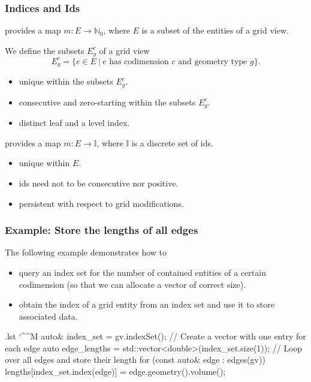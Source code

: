 \documentclass[ignorenonframetext,11pt]{beamer}
\makeatletter
\theoremstyle{definition}
\newenvironment{codeblock}{%
  \begin{tcolorbox}[size=small,oversize,boxrule=0pt,opacityframe=0,colback=blue!30!black!5!white]}{%
  \end{tcolorbox}}
\newenvironment{cppcode}{%
  \begingroup
  \@bsphack
  \immediate\openout\lstvrb@out\jobname.lst
  \let\do\@makeother\dospecials\catcode`\^^M\active
  \def\verbatim@processline{%
    \immediate\write\lstvrb@out{\the\verbatim@line}}%
  \verbatim@start}{%
  \immediate\closeout\lstvrb@out
  \@esphack
  \endgroup
  \begin{codeblock}
    \vspace*{-1ex}
    
    \vspace*{-1ex}
  \end{codeblock}}
\makeatother
\begin{document}
\begin{frame}
  \frametitle{Indices and Ids}

  provides a map $m : E \to \mathbb{N}_0$,
  where $E$ is a subset of the entities of a grid view.

  We define the subsets $E_g^c$ of a grid view
  \[ E_g^c = \{e\in E \ | \ \textrm{$e$ has codimension $c$ and geometry type $g$} \}.\]

  \begin{itemize}
  \item unique within the subsets $E_g^c$.
  \item consecutive and zero-starting within the subsets $E_g^c$.
  \item distinct leaf and a level index.
  \end{itemize}

  \pause
  provides a map $m : E \to \mathbb{I}$, where $\mathbb{I}$ is a discrete
  set of ids.

  \begin{itemize}
  \item unique within $E$.
  \item ids need not to be consecutive nor positive.
  \item persistent with respect to grid modifications.
  \end{itemize}

\end{frame}

\begin{frame}[fragile]
  \frametitle{Example: Store the lengths of all edges}
  The following example demonstrates how to
  \begin{itemize}
  \item query an index set for the number of contained
    entities of a certain codimension (so that we can allocate a vector of correct size).
  \item obtain the index of a grid entity from an index set and use it to store associated data.
  \end{itemize}
  \begin{cppcode}
auto& index_set = gv.indexSet();
// Create a vector with one entry for each edge
auto edge_lengths = std::vector<double>(index_set.size(1));
// Loop over all edges and store their length
for (const auto& edge : edges(gv))
  lengths[index_set.index(edge)] = edge.geometry().volume();
\end{cppcode}
\end{frame}
\end{document}
